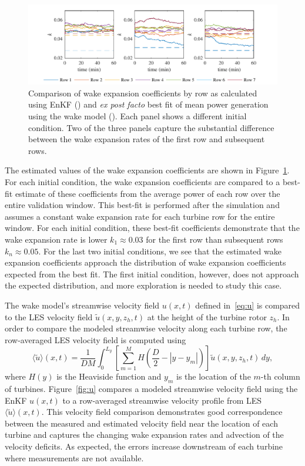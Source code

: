 \begin{figure}
\centering
\includegraphics{./fig/k.pdf}
\caption{Comparison of wake expansion coefficients by row as calculated using EnKF (\full) and \textit{ex post facto} best fit of mean power generation using the wake model (\broken). Each panel shows a different initial condition. Two of the three panels capture the substantial difference between the wake expansion rates of the first row and subsequent rows.}
\label{fig:k}
\end{figure}


The estimated values of the wake expansion coefficients are shown in Figure~\ref{fig:k}. For each initial condition, the wake expansion coefficients are compared to a best-fit estimate of these coefficients from the average power of each row over the entire validation window. This best-fit is performed after the simulation and assumes a constant wake expansion rate for each turbine row for the entire window. For each initial condition, these best-fit coefficients demonstrate that the wake expansion rate is lower $k_1 \approx 0.03$ for the first row than subsequent rows $k_n \approx 0.05$. For the last two initial conditions, we see that the estimated wake expansion coefficients approach the distribution of wake expansion coefficients expected from the best fit. The first initial condition, however, does not approach the expected distribution, and more exploration is needed to study this case.


The wake model's streamwise velocity field $u(x,t)$ defined in~\eqref{eq:u} is compared to the LES velocity field $\tilde{u}(x,y,z_h,t)$ at the height of the turbine rotor $z_h$. In order to compare the modeled streamwise velocity along each turbine row, the row-averaged LES velocity field is computed using
\begin{equation}
\label{eq:u_tilde_avg}
\langle \tilde{u} \rangle(x,t) = \frac{1}{DM}\int_0^{L_y} \left[\sum_{m=1}^M H\left(\frac{D}{2}-|y-y_m|\right) \right] \tilde{u}(x,y,z_h,t) \, dy,
\end{equation}
where $H(y)$ is the Heaviside function and $y_m$ is the location of the $m$-th column of turbines. Figure~\ref{fig:u} compares a modeled streamwise velocity field using the EnKF $u(x,t)$ to a row-averaged streamwise velocity profile from LES $\langle \tilde{u} \rangle(x,t)$. This velocity field comparison demonstrates good correspondence between the measured and estimated velocity field near the location of each turbine and captures the changing wake expansion rates and advection of the velocity deficits. As expected, the errors increase downstream of each turbine where measurements are not available.

